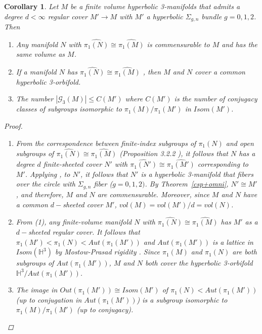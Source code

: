 \documentclass[12pt, reqno,oneside]{amsart}
\newtheorem{cor}[lemma]{Corollary}
\theoremstyle{definition}
\theoremstyle{plain}
\theoremstyle{TheoremNum}
\newcommand{\Hh}{{\mathbb H}}
\numberwithin{equation}{section}
\numberwithin{table}{section}
\begin{document}
\begin{cor}\label{keycor}
    Let $M$ be a finite volume hyperbolic 3-manifolds that admits a degree $d<\infty$ regular cover $M'\to M$ with $M'$ a hyperbolic $\Sigma_{g,n}$ bundle $g=0,1,2$. Then
    \begin{enumerate}
        \item Any manifold $N$ with $\widehat{\pi_1(N)}\cong\widehat{\pi_1(M)}$ is commensurable to $M$ and has the same volume as $M$.
        \item If a manifold $N$ has $\widehat{\pi_1(N)}\cong\widehat{\pi_1(M)}$ , then $M$ and $N$ cover a common hyperbolic 3-orbifold. 
        \item The number $|\mathcal{G}_3(M)|\leq C(M')$ where $C(M')$ is the number of conjugacy classes of subgroups isomorphic to $\pi_1(M)/\pi_1(M')$ in $Isom(M')$. 
    \end{enumerate}
\begin{proof}
    \begin{enumerate}
        \item From the correspondence between finite-index subgroups of $\pi_1(N)$ and open subgroups of $\widehat{\pi_1(N)}\cong\widehat{\pi_1(M)}$ (Proposition 3.2.2 \cite{RZ}), it follows that $N$ has a degree $d$ finite-sheeted cover $N'$ with $\widehat{\pi_1(N')}\cong\widehat{\pi_1(M')}$ corresponding to $M'$. Applying \cite{WZ1},\cite{JZ} to $N'$, it follows that $N'$ is a hyperbolic 3-manifold that fibers over the circle with $\Sigma_{g,n}$ fiber ($g=0,1,2)$. By Theorem~\ref{csp+omni}, $N'\cong M'$, and therefore, $M$ and $N$ are commensurable. Moreover, since $M$ and $N$ have a common $d-$sheeted cover $M'$, $vol(M)=vol(M')/d=vol(N)$. 
        \item From (1), any finite-volume manifold $N$ with 
        $\widehat{\pi_1(N)}\cong\widehat{\pi_1(M)}$ has $M'$ as a $d-$sheeted regular cover. It follows that $\pi_1(M')<\pi_1(N)<Aut(\pi_1(M'))$ and $Aut(\pi_1(M'))$ is a lattice in $Isom(\Hh^3)$ by Mostow-Prasad rigidity \cite{Mostow}\cite{Prasad}. Since $\pi_1(M)$ and $\pi_1(N)$ are both subgroups of $Aut(\pi_1(M'))$, $M$ and $N$ both cover the hyperbolic 3-orbifold $\Hh^3/Aut(\pi_1(M'))$. 
        \item The image in $Out(\pi_1(M'))\cong Isom(M')$ of $\pi_1(N)<Aut(\pi_1(M'))$ (up to conjugation in $Aut(\pi_1(M'))$) is a subgroup isomorphic to $\pi_1(M)/\pi_1(M')$ (up to conjugacy). 
    \end{enumerate}
\end{proof}      
\end{cor}
\end{document}
